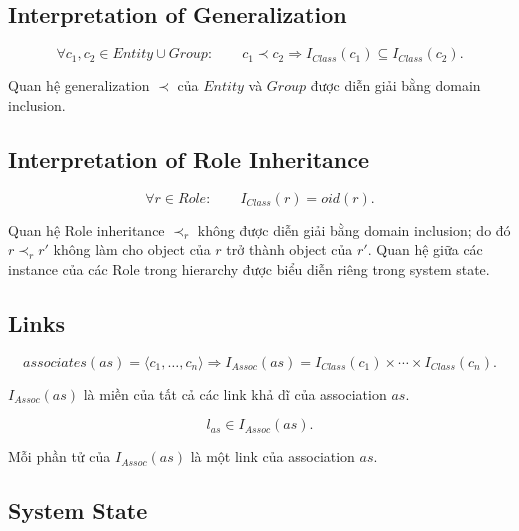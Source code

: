 \documentclass[12pt,a4paper]{article}
\theoremstyle{definition}
\begin{document}
\subsection{Interpretation of Generalization}

\[
\forall c_1,c_2\in Entity\cup Group:
\qquad
c_1\prec c_2
\Longrightarrow
I_{Class}(c_1)
\subseteq
I_{Class}(c_2).
\]

Quan hệ generalization $\prec$ của $Entity$ và $Group$ được diễn giải
bằng domain inclusion.


\subsection{Interpretation of Role Inheritance}

\[
\forall r\in Role:
\qquad
I_{Class}(r)=oid(r).
\]

Quan hệ Role inheritance $\prec_r$ không được diễn giải bằng domain
inclusion; do đó $r\prec_r r'$ không làm cho object của $r$ trở thành
object của $r'$. Quan hệ giữa các instance của các Role trong hierarchy
được biểu diễn riêng trong system state.


\subsection{Links}

\[
associates(as)=\langle c_1,\ldots,c_n\rangle
\Longrightarrow
I_{Assoc}(as)
=
I_{Class}(c_1)
\times\cdots\times
I_{Class}(c_n).
\]

$I_{Assoc}(as)$ là miền của tất cả các link khả dĩ của association $as$.

\[
l_{as}\in I_{Assoc}(as).
\]

Mỗi phần tử của $I_{Assoc}(as)$ là một link của association $as$.




\subsection{System State}
\end{document}
